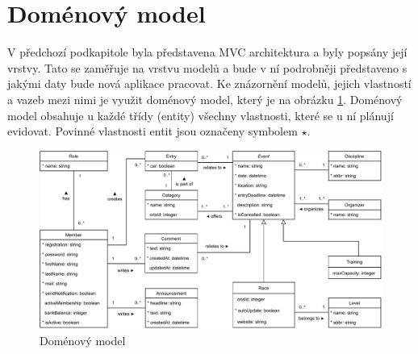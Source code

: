 \section{Doménový model}
V předchozí podkapitole byla představena MVC architektura a byly popsány její vrstvy. Tato se zaměřuje na vrstvu modelů a bude v ní podrobněji představeno s jakými daty bude nová aplikace pracovat. Ke znázornění modelů, jejich vlastností a vazeb mezi nimi je využit doménový model, který je na obrázku \ref{figure:domain-model}. Doménový model obsahuje u každé třídy (entity) všechny vlastnosti, které se u ní plánují evidovat. Povinné vlastnosti entit jsou označeny symbolem $ \star $.

\begin{landscape}
	\begin{figure}[h]
		\caption{Doménový model}
		\label{figure:domain-model}
		\centering
		\includegraphics[width=0.96\linewidth]{images/domain-model.pdf}
	\end{figure}
\end{landscape}

